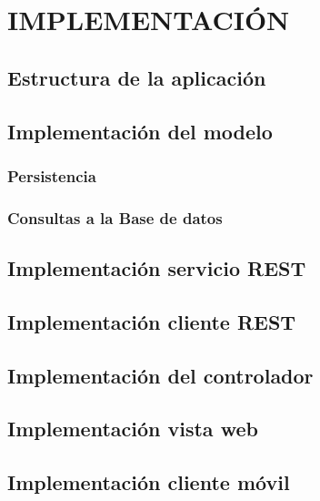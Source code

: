 \chapter[Implementación]{
  \label{chp:implementacion}
  IMPLEMENTACIÓN
}
\thispagestyle{numberingStyle}
\pagestyle{numberingStyle}


\section{Estructura de la aplicación}

\section{Implementación del modelo}
\subsection{Persistencia}
\subsection{Consultas a la Base de datos}
\section{Implementación servicio REST}
\section{Implementación cliente REST}
\section{Implementación del controlador}
\section{Implementación vista web}
\section{Implementación cliente móvil}
